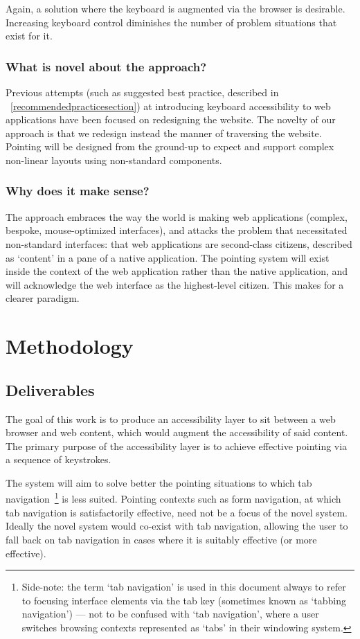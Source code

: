 \documentclass[a4paper, 11pt]{article}
\begin{document}
Again, a solution where the keyboard is augmented via the browser is desirable. Increasing keyboard control diminishes the number of problem situations that exist for it.

\subsubsection{What is novel about the approach?}
Previous attempts (such as suggested best practice, described in ~\cref{recommendedpracticesection}) at introducing keyboard accessibility to web applications have been focused on redesigning the website. The novelty of our approach is that we redesign instead the manner of traversing the website. Pointing will be designed from the ground-up to expect and support complex non-linear layouts using non-standard components.
\subsubsection{Why does it make sense?}
The approach embraces the way the world is making web applications (complex, bespoke, mouse-optimized interfaces), and attacks the problem that necessitated non-standard interfaces: that web applications are second-class citizens, described as `content' in a pane of a native application.
The pointing system will exist inside the context of the web application rather than the native application, and will acknowledge the web interface as the highest-level citizen. This makes for a clearer paradigm.
\section{Methodology}
\subsection{Deliverables}
The goal of this work is to produce an accessibility layer to sit between a web browser and web content, which would augment the accessibility of said content.
The primary purpose of the accessibility layer is to achieve effective pointing via a sequence of keystrokes.

The system will aim to solve better the pointing situations to which tab navigation~\footnote{Side-note: the term `tab navigation' is used in this document always to refer to focusing interface elements via the tab key (sometimes known as `tabbing navigation') --- not to be confused with `tab navigation', where a user switches browsing contexts represented as `tabs' in their windowing system.} is less suited. Pointing contexts such as form navigation, at which tab navigation is satisfactorily effective, need not be a focus of the novel system. Ideally the novel system would co-exist with tab navigation, allowing the user to fall back on tab navigation in cases where it is suitably effective (or more effective).
\end{document}
